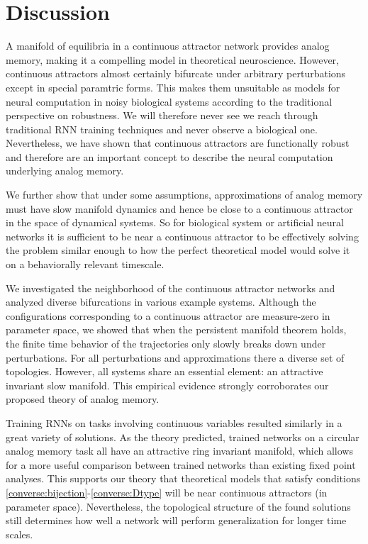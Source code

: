 \documentclass{article} %
\newcounter{ct}
\theoremstyle{definition}
\theoremstyle{remark}
\begin{document}
\section{Discussion}
A manifold of equilibria in a continuous attractor network provides analog memory, making it a compelling model in theoretical neuroscience.
However, continuous attractors almost certainly bifurcate under arbitrary perturbations except in special paramtric forms.
This makes them unsuitable as models for neural computation in noisy biological systems according to the traditional perspective on robustness.
We will therefore never see we reach through traditional RNN training techniques and never observe a biological one.
Nevertheless, we have shown that continuous attractors are functionally robust and therefore are an important concept to describe the neural computation underlying analog memory.

We further show that under some assumptions, approximations of analog memory must have slow manifold dynamics and hence be close to a continuous attractor in the space of dynamical systems.
So for biological system or artificial neural networks it is sufficient to be near a continuous attractor to be effectively solving the problem similar enough to how the perfect theoretical model would solve it on a behaviorally relevant timescale.


We investigated the neighborhood of the continuous attractor networks and analyzed diverse bifurcations in various example systems.
Although the configurations corresponding to a continuous attractor are measure-zero in parameter space, we showed that when the persistent manifold theorem holds, the finite time behavior of the trajectories only slowly breaks down under perturbations.
For all perturbations and approximations there a diverse set of topologies.
However, all systems share an essential element: an attractive invariant slow manifold.
This empirical evidence strongly corroborates our proposed theory of analog memory.

Training RNNs on tasks involving continuous variables resulted similarly in a great variety of solutions.
As the theory predicted, trained networks on a circular analog memory task all have an attractive ring invariant manifold, which allows for a more useful comparison between trained networks than existing fixed point analyses.
This supports our theory that theoretical models that satisfy conditions \ref{converse:bijection}-\ref{converse:Dtype} will be near continuous attractors (in parameter space).
Nevertheless, the topological structure of the found solutions still determines how well a network will perform generalization for longer time scales.
\end{document}
